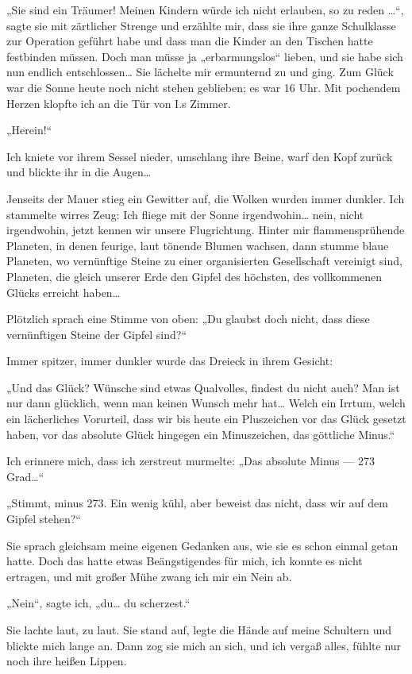 „Sie sind ein Träumer! Meinen Kindern würde ich nicht erlauben, so
zu reden \ldots{}“, sagte sie mit zärtlicher Strenge und erzählte mir,
dass sie ihre ganze Schulklasse zur Operation geführt habe und dass
man die Kinder an den Tischen hatte festbinden müssen. Doch man
müsse ja „erbarmungslos“ lieben, und sie habe sich nun endlich
entschlossen\ldots{} Sie lächelte mir ermunternd zu und ging. Zum Glück
war die Sonne heute noch nicht stehen geblieben; es war 16 Uhr. Mit
pochendem Herzen klopfte ich an die Tür von I.s Zimmer.

„Herein!“

Ich kniete vor ihrem Sessel nieder, umschlang ihre Beine, warf den
Kopf zurück und blickte ihr in die Augen\ldots{}

Jenseits der Mauer
stieg ein Gewitter auf, die Wolken wurden immer dunkler. Ich
stammelte wirres Zeug: Ich fliege mit der Sonne irgendwohin\ldots{}
nein, nicht irgendwohin, jetzt kennen wir unsere Flugrichtung.
Hinter mir flammensprühende Planeten, in denen feurige, laut
tönende Blumen wachsen, dann stumme blaue Planeten, wo vernünftige
Steine zu einer organisierten Gesellschaft vereinigt sind,
Planeten, die gleich unserer Erde den Gipfel des höchsten, des
vollkommenen Glücks erreicht haben\ldots{}

Plötzlich sprach eine Stimme von oben: „Du glaubst doch nicht, dass
diese vernünftigen Steine der Gipfel sind?“

Immer spitzer, immer dunkler wurde das Dreieck in ihrem Gesicht:

„Und das Glück? Wünsche sind etwas Qualvolles, findest du nicht
auch? Man ist nur dann glücklich, wenn man keinen Wunsch mehr
hat\ldots{} Welch ein Irrtum, welch ein lächerliches Vorurteil, dass wir
bis heute ein Pluszeichen vor das Glück gesetzt haben, vor das
absolute Glück hingegen ein Minuszeichen, das göttliche Minus.“

Ich
erinnere mich, dass ich zerstreut murmelte: „Das absolute Minus —
273 Grad\ldots{}“

„Stimmt, minus 273. Ein wenig kühl, aber beweist das nicht, dass
wir auf dem Gipfel stehen?“

Sie sprach gleichsam meine eigenen
Gedanken aus, wie sie es schon einmal getan hatte. Doch das hatte
etwas Beängstigendes für mich, ich konnte es nicht ertragen, und
mit großer Mühe zwang ich mir ein Nein ab.

„Nein“, sagte ich, „du\ldots{} du scherzest.“

Sie lachte laut, zu laut. Sie stand auf,
legte die Hände auf meine Schultern und blickte mich lange an. Dann
zog sie mich an sich, und ich vergaß alles, fühlte nur noch ihre
heißen Lippen.


